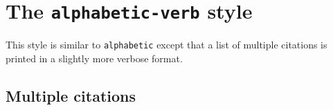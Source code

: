 \documentclass[a4paper]{article}
\begin{document}
\section*{The \texttt{alphabetic-verb} style}

This style is similar to \texttt{alphabetic} except that a list of
multiple citations is printed in a slightly more verbose format.

\subsection*{Multiple citations}

\cite{hammond,massa,augustine,cotton,murray,bertram}

\clearpage
\printbibliography
\end{document}
